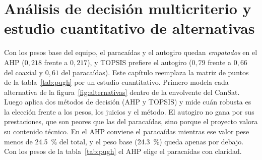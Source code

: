 \chapter[Decisión multicriterio y estudio de alternativas]{Análisis de decisión multicriterio y estudio cuantitativo de alternativas}\label{cap:decision}

Con los pesos base del equipo, el paracaídas y el autogiro quedan \emph{empatados} en el
AHP ($0{,}218$ frente a $0{,}217$), y TOPSIS prefiere el autogiro ($0{,}79$ frente a
$0{,}66$ del coaxial y $0{,}61$ del paracaídas). Este capítulo reemplaza la matriz de puntos de la
tabla~\ref{tab:pugh} por un estudio cuantitativo. Primero modela cada alternativa de la
figura~\ref{fig:alternativas} dentro de la envolvente del CanSat. Luego aplica dos
métodos de decisión (AHP y TOPSIS) y mide cuán robusta es la elección frente a los pesos,
los juicios y el método. El autogiro no gana por sus prestaciones, que son peores que las del paracaídas, sino
porque el proyecto valora su contenido técnico. En el AHP conviene el paracaídas mientras
ese valor pese menos de \SI{24.5}{\percent} del total, y el peso base
(\SI{24.3}{\percent}) queda apenas por debajo. Con los pesos de la tabla~\ref{tab:pugh}
el AHP elige el paracaídas con claridad.


